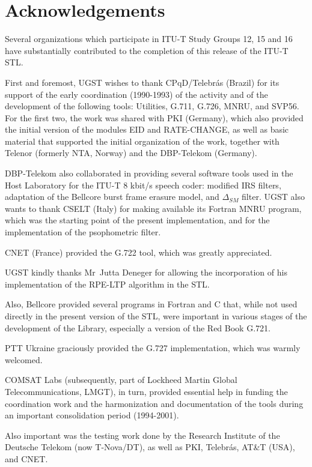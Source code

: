 \section{Acknowledgements}

Several organizations which participate in ITU-T Study Groups 12, 15 and 16 have substantially contributed to the completion of this release of the ITU-T STL.

First and foremost, UGST wishes to thank CPqD/Telebr\'as (Brazil) for its support of the early coordination (1990-1993) of the activity and of the development of the following tools: Utilities, G.711, G.726, MNRU, and SVP56.
For the first two, the work was shared with PKI (Germany), which also provided the initial version of the modules EID and RATE-CHANGE, as well as basic material that supported the initial organization of the work, together with Telenor (formerly NTA, Norway) and the DBP-Telekom (Germany).

DBP-Telekom also collaborated in providing several software tools used in the Host Laboratory for the ITU-T 8 kbit/s speech coder: modified IRS filters, adaptation of the Bellcore burst frame erasure model, and $\Delta_{SM}$ filter.
UGST also wants to thank CSELT (Italy) for making available its Fortran MNRU program, which was the starting point of the present implementation, and for the implementation of the psophometric filter.

CNET (France) provided the G.722 tool, which was greatly appreciated.

UGST kindly thanks Mr~Jutta Deneger for allowing the incorporation of his implementation of the RPE-LTP algorithm in the STL.

Also, Bellcore provided several programs in Fortran and C that, while not used directly in the present version of the STL, were important in various stages of the development of the Library, especially a version of the Red Book G.721.

PTT Ukraine graciously provided the G.727 implementation, which was warmly welcomed.

COMSAT Labs (subsequently, part of Lockheed Martin Global Telecommunications, LMGT), in turn, provided essential help in funding the coordination work and the harmonization and documentation of the tools during an important consolidation period (1994-2001).

Also important was the testing work done by the Research Institute of the Deutsche Telekom (now T-Nova/DT), as well as PKI, Telebr\'{a}s, AT\&T (USA), and CNET.


